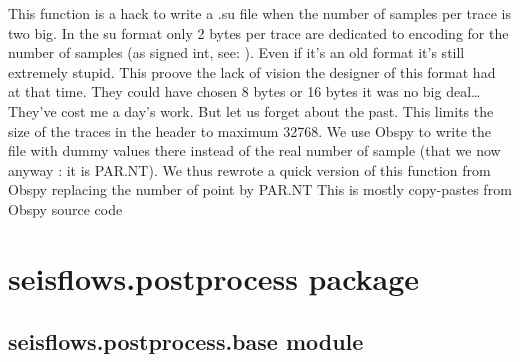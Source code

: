 \documentclass[letterpaper,10pt,english]{sphinxmanual}
\begin{document}

\begin{fulllineitems}
\label{\detokenize{ref/seisflows.plugins:seisflows.plugins.writers.writeBigSuFile}}
This function is a hack to write a .su file when the number
of samples per trace is two big.
In the su format only 2 bytes per trace are dedicated to encoding for
the number of samples (as signed int, see:
).
Even if it’s an old format it’s still extremely stupid.
This proove the lack of vision the designer of this format had at that
time. They could have chosen 8 bytes or 16 bytes it was no big deal…
They’ve cost me a day’s work.
But let us forget about the past. This limits the size of the
traces in the header to maximum 32768.
We use Obspy to write the file with dummy values there instead of the
real number of sample (that we now anyway : it is PAR.NT).
We thus rewrote a quick version of this function from Obspy replacing
the number of point by PAR.NT
This is mostly copy-pastes from Obspy source code

\end{fulllineitems}



\section{seisflows.postprocess package}
\label{\detokenize{ref/seisflows.postprocess:seisflows-postprocess-package}}\label{\detokenize{ref/seisflows.postprocess::doc}}

\subsection{seisflows.postprocess.base module}
\label{\detokenize{ref/seisflows.postprocess:module-seisflows.postprocess.base}}\label{\detokenize{ref/seisflows.postprocess:seisflows-postprocess-base-module}}
\end{document}
